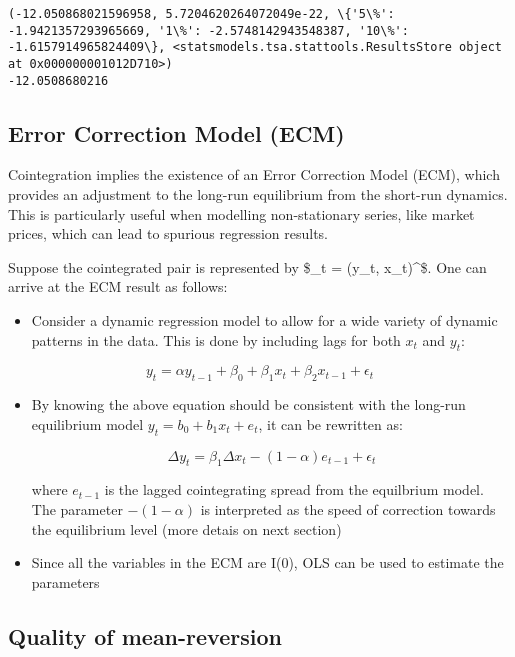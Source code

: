 \documentclass{article}
\providecommand{\tightlist}{%
      \setlength{\itemsep}{0pt}\setlength{\parskip}{0pt}}
\begin{document}
    \begin{Verbatim}[commandchars=\\\{\}]
(-12.050868021596958, 5.7204620264072049e-22, \{'5\%': -1.9421357293965669, '1\%': -2.5748142943548387, '10\%': -1.6157914965824409\}, <statsmodels.tsa.stattools.ResultsStore object at 0x000000001012D710>)
-12.0508680216
    \end{Verbatim}

    \subsection{Error Correction Model
(ECM)}\label{error-correction-model-ecm}

Cointegration implies the existence of an Error Correction Model (ECM),
which provides an adjustment to the long-run equilibrium from the
short-run dynamics. This is particularly useful when modelling
non-stationary series, like market prices, which can lead to spurious
regression results.

Suppose the cointegrated pair is represented by \$\_t = (y\_t,
x\_t)\^{}\prime \$. One can arrive at the ECM result as follows:

\begin{itemize}
\tightlist
\item
  Consider a dynamic regression model to allow for a wide variety of
  dynamic patterns in the data. This is done by including lags for both
  \(x_t\) and \(y_t\):
\end{itemize}

\[
y_t = \alpha y_{t-1} +  \beta_0 + \beta_1 x_t + \beta_2 x_{t-1} + \epsilon_t
\]

\begin{itemize}
\item
  By knowing the above equation should be consistent with the long-run
  equilibrium model \(y_t = b_0 + b_1 x_t + e_t\), it can be rewritten
  as:

  \[
  \Delta y_{t} = \beta_1 \Delta x_t - (1- \alpha) e_{t-1} + \epsilon_t
  \]

  where \(e_{t-1}\) is the lagged cointegrating spread from the
  equilbrium model. The parameter \(-(1-\alpha)\) is interpreted as the
  speed of correction towards the equilibrium level (more detais on next
  section)
\item
  Since all the variables in the ECM are I(0), OLS can be used to
  estimate the parameters
\end{itemize}

    \subsection{Quality of mean-reversion}\label{quality-of-mean-reversion}
\end{document}
